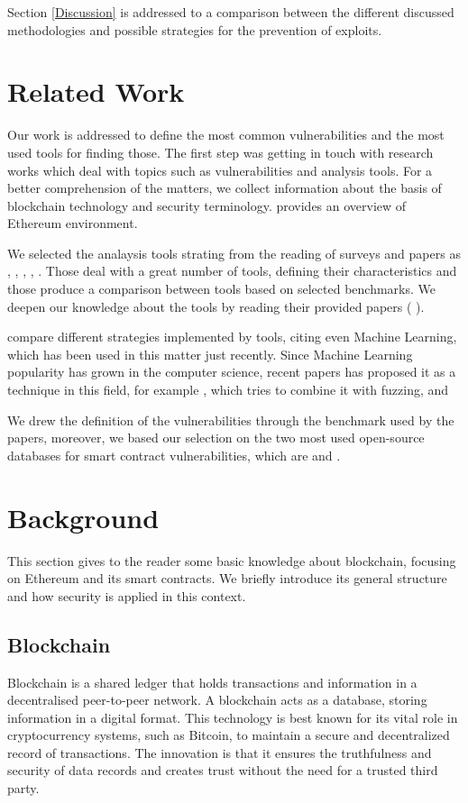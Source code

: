 \documentclass[a4paper,sigconf, language=french,
language=german, language=spanish, language=english]{acmart}
\begin{document}
Section \ref{Discussion} is addressed to a comparison between the different discussed methodologies and possible strategies for the prevention of exploits.



\section{Related Work}
\label{RelatedWork}
Our work is addressed to define the most common vulnerabilities and the most used tools for finding those.
The first step was getting in touch with research works which deal with topics such as vulnerabilities and analysis tools. For a better comprehension of the matters, we collect information about the basis of blockchain technology and security terminology. \cite{ETHfoundation} provides an overview 
of Ethereum environment. 

We selected the analaysis tools strating from the reading of surveys and papers as \cite{SurvTools}, \cite{Thesis}, \cite{AutomaticTools}, \cite{AttacksAndProtection}, \cite{ToolsAndVuln}. 
Those deal with a great number of tools, defining their characteristics and those produce a comparison between tools based on selected benchmarks. We deepen our knowledge about the tools by reading their provided papers
(\cite{Slither} \cite{Echidna} \cite{Manticore} \cite{SmartTest} \cite{Oyente}). 

\cite{Methodologies} compare different strategies implemented by tools, citing even Machine Learning, which has been used in this matter just recently.
Since Machine Learning popularity has grown in the computer science, recent papers has proposed it as a technique in this field, for example \cite{FuzzML}, which tries to combine it with fuzzing, and \cite{MLSmartContractPropose}

We drew the definition of the vulnerabilities through the benchmark used by the papers, moreover, we based our selection on the two most used open-source databases for smart contract vulnerabilities, which are \cite{SWC} and \cite{DASP10}.

\section{Background}
\label{Background}
This section gives to the reader some basic knowledge about blockchain, focusing on Ethereum and its smart contracts. We briefly introduce its general structure and how security is applied in this context.
\subsection{Blockchain}
Blockchain is a shared ledger that holds transactions and information in a decentralised peer-to-peer network. A blockchain acts as a database, storing information in a digital format. 
This technology is best known for its vital role in cryptocurrency systems, such as Bitcoin, to maintain a secure and decentralized record of transactions. 
The innovation is that it ensures the truthfulness and security of data records and creates trust without the need for a trusted third party.
\end{document}
